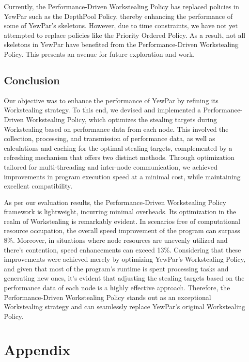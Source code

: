 \documentclass{mproj}
\begin{document}
Currently, the Performance-Driven Workstealing Policy has replaced policies in YewPar such as the DepthPool Policy,
thereby enhancing the performance of some of YewPar's skeletons.
However, due to time constraints, we have not yet attempted to replace policies like the Priority Ordered Policy.
As a result, not all skeletons in YewPar have benefited from the Performance-Driven Workstealing Policy.
This presents an avenue for future exploration and work.

\section{Conclusion}
Our objective was to enhance the performance of YewPar by refining its Workstealing strategy.
To this end, we devised and implemented a Performance-Driven Workstealing Policy,
which optimizes the stealing targets during Workstealing based on performance data from each node.
This involved the collection, processing, and transmission of performance data,
as well as calculations and caching for the optimal stealing targets,
complemented by a refreshing mechanism that offers two distinct methods.
Through optimization tailored for multi-threading and inter-node communication,
we achieved improvements in program execution speed at a minimal cost,
while maintaining excellent compatibility.

As per our evaluation results,
the Performance-Driven Workstealing Policy framework is lightweight, incurring minimal overheads.
Its optimization in the realm of Workstealing is remarkably evident.
In scenarios free of computational resource occupation,
the overall speed improvement of the program can surpass 8\%.
Moreover, in situations where node resources are unevenly utilized and there's contention,
speed enhancements can exceed 13\%.
Considering that these improvements were achieved merely by optimizing YewPar's Workstealing Policy,
and given that most of the program's runtime is spent processing tasks and generating new ones,
it's evident that adjusting the stealing targets based on the performance data of each node is a highly effective approach.
Therefore, the Performance-Driven Workstealing Policy stands out as an exceptional Workstealing strategy
and can seamlessly replace YewPar's original Workstealing Policy.


\appendix %
\chapter{Appendix}
\end{document}
